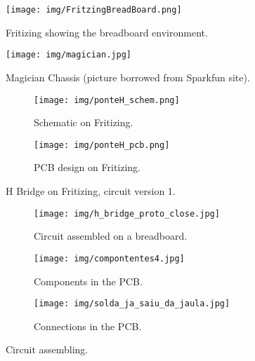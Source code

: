 \begin{figure}
\centering
\centering%
\texttt{[image: img/FritzingBreadBoard.png]}
\caption{Fritizing showing the breadboard environment.}
\label{fig:breadboard}%
\end{figure}

\begin{figure}
\centering
\centering%
\texttt{[image: img/magician.jpg]}
\caption{Magician Chassis (picture borrowed from Sparkfun site).}
\label{fig:mag}%
\end{figure}

\begin{figure}
\centering
\begin{subfigure}{\columnwidth}
\centering
\texttt{[image: img/ponteH\_schem.png]}
\caption{Schematic on Fritizing.}
\label{fig:schem_fritz}
\end{subfigure}

\begin{subfigure}{\columnwidth}
\centering
\texttt{[image: img/ponteH\_pcb.png]}
\caption{PCB design on Fritizing.}
\label{fig:pcb_fritz}
\end{subfigure}
\label{fig:version1}
\caption{H Bridge on Fritizing, circuit version 1.}
\end{figure}


\begin{figure}
\centering
\begin{subfigure}{\columnwidth}
\centering
\texttt{[image: img/h\_bridge\_proto\_close.jpg]}
\caption{Circuit assembled on a breadboard.}
\label{fig:proto_h}
\end{subfigure}

\begin{subfigure}{.45\columnwidth}
\texttt{[image: img/compontentes4.jpg]}
\caption{Components in the PCB.}
\label{fig:pcb_top}
\end{subfigure}
\begin{subfigure}{.45\columnwidth}
\centering
\texttt{[image: img/solda\_ja\_saiu\_da\_jaula.jpg]}
\caption{Connections in the PCB.}
\label{fig:pcb_bot}
\end{subfigure}

\caption{Circuit assembling.}
\end{figure}
